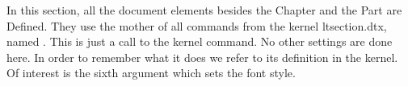 

In this section, all the document elements besides the Chapter and the Part are Defined. They use the mother of all commands from the kernel
ltsection.dtx, named . This is just a call to the kernel command. No other settings are done here. In order to remember what it does we refer to its definition in the kernel. Of interest is the sixth argument which sets the font style.

